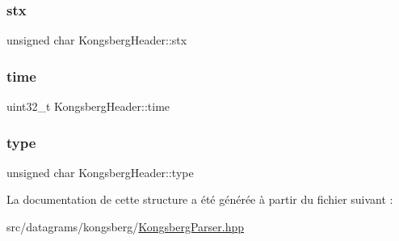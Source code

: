 \subsubsection{\texorpdfstring{stx}{stx}}
{\footnotesize\ttfamily unsigned char Kongsberg\+Header\+::stx}

\mbox{\label{structKongsbergHeader_aa9701e6d9deaf91ce47631221b50ec6c}} 
\subsubsection{\texorpdfstring{time}{time}}
{\footnotesize\ttfamily uint32\+\_\+t Kongsberg\+Header\+::time}

\mbox{\label{structKongsbergHeader_a53429e4241d2b6f9163ece6ff6eae4d3}} 
\subsubsection{\texorpdfstring{type}{type}}
{\footnotesize\ttfamily unsigned char Kongsberg\+Header\+::type}



La documentation de cette structure a été générée à partir du fichier suivant \+:\begin{DoxyCompactItemize}
\item 
src/datagrams/kongsberg/\hyperlink{KongsbergParser_8hpp}{Kongsberg\+Parser.\+hpp}\end{DoxyCompactItemize}
